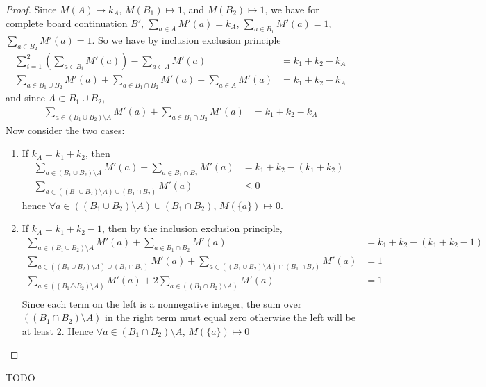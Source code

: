 \begin{proof}
    Since $M(A)\mapsto k_A$, $M(B_1)\mapsto 1$, and $M(B_2)\mapsto 1$, we have for complete board continuation $B'$, $\sum_{a\in A}M'(a)=k_A$, $\sum_{a\in B_1}M'(a)=1$, $\sum_{a\in B_2}M'(a)=1$. So we have by inclusion exclusion principle\begin{align*}
        \sum_{i=1}^2\left(\sum_{a\in B_i}M'(a)\right)-\sum_{a\in A}M'(a)&=k_1+k_2-k_A\\
        \sum_{a\in B_1\cup B_2}M'(a)+\sum_{a\in B_1\cap B_2}M'(a)-\sum_{a\in A}M'(a)&=k_1+k_2-k_A
    \end{align*}
    and since $A\subset B_1\cup B_2$,\begin{align*}
        \sum_{a\in (B_1\cup B_2)\setminus A}M'(a)+\sum_{a\in B_1\cap B_2}M'(a)&=k_1+k_2-k_A
    \end{align*}
    Now consider the two cases:\begin{enumerate}
        \item If $k_A=k_1+k_2$, then \begin{align*}
            \sum_{a\in (B_1\cup B_2)\setminus A}M'(a)+\sum_{a\in B_1\cap B_2}M'(a)&=k_1+k_2-(k_1+k_2)\\
            \sum_{a\in ((B_1\cup B_2)\setminus A)\cup (B_1\cap B_2)}M'(a)&\leq0
        \end{align*}
        hence $\forall a\in((B_1\cup B_2)\setminus A)\cup (B_1\cap B_2)$, $M(\{a\})\mapsto 0$.

        \item If $k_A=k_1+k_2-1$, then by the inclusion exclusion principle,\begin{align*}
            \sum_{a\in (B_1\cup B_2)\setminus A}M'(a)+\sum_{a\in B_1\cap B_2}M'(a)&=k_1+k_2-(k_1+k_2-1)\\
            \sum_{a\in ((B_1\cup B_2)\setminus A)\cup (B_1\cap B_2)}M'(a)+\sum_{a\in ((B_1\cup B_2)\setminus A)\cap (B_1\cap B_2)}M'(a)&=1\\
            \sum_{a\in ((B_1\triangle B_2)\setminus A)}M'(a)+2\sum_{a\in ((B_1\cap B_2)\setminus A)}M'(a)&=1\\
        \end{align*}
        Since each term on the left is a nonnegative integer, the sum over $((B_1\cap B_2)\setminus A)$ in the right term must equal zero otherwise the left will be at least 2. Hence $\forall a\in(B_1\cap B_2)\setminus A$, $M(\{a\})\mapsto 0$
    \end{enumerate}
\end{proof}

TODO\\